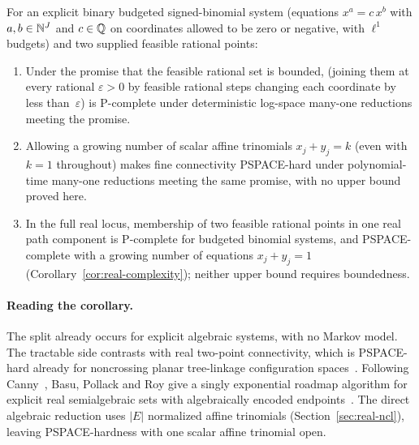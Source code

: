 \begin{corollary}\label{cor:intro-algebraic}
For an explicit binary budgeted signed-binomial system (equations
$x^a=c\,x^b$ with $a,b\in\mathbb{N}^J$ and $c\in\mathbb{Q}$ on coordinates allowed to be
zero or negative, with $\ell^1$ budgets)
and two supplied feasible rational points:
\begin{enumerate}
\item[(i)] Under the promise that the feasible rational set is bounded,
 (joining them at every rational $\varepsilon>0$
by feasible rational steps changing each coordinate by less than~$\varepsilon$)
is P-complete under deterministic log-space many-one reductions meeting the
promise.
\item[(ii)] Allowing a growing number of scalar affine trinomials
$x_j+y_j=k$ (even with $k=1$ throughout) makes fine connectivity PSPACE-hard
under polynomial-time many-one reductions meeting the same promise, with no
upper bound proved here.
\item[(iii)] In the full real locus, membership of two feasible rational
points in one real path component is P-complete for budgeted binomial
systems, and PSPACE-complete with a growing number of equations $x_j+y_j=1$
(Corollary~\ref{cor:real-complexity}); neither upper bound requires
boundedness.
\end{enumerate}
\end{corollary}

\paragraph{Reading the corollary.} The split already occurs for explicit
algebraic systems, with no Markov model. The tractable side contrasts with
real two-point connectivity, which is PSPACE-hard already for noncrossing
planar tree-linkage configuration spaces~\cite[Theorem~2]{altknauerrotewhitesides}.
Following Canny~\cite{canny93}, Basu, Pollack and Roy give a singly
exponential roadmap algorithm for explicit real semialgebraic sets with
algebraically encoded endpoints~\cite[Theorem~3]{basupollackroy}.
The direct algebraic reduction uses $|E|$ normalized affine trinomials
(Section~\ref{sec:real-ncl}), leaving PSPACE-hardness with one scalar affine
trinomial open.

